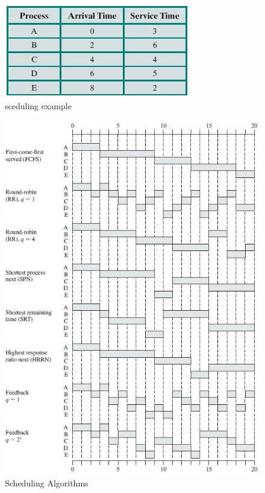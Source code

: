 \begin{figure}[h!]
\centering
\includegraphics{img/schedule_ex.JPG}
\caption{sceduling example}
\label{fig:schedule_ex}
\end{figure}

\begin{figure}[h!]
\centering
\includegraphics{img/schedule_alg.JPG}
\caption{Scheduling Algorithms}
\label{fig:schedule_alg}
\end{figure}

\FloatBarrier
